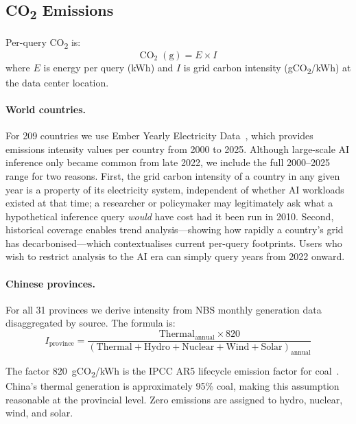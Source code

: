 \documentclass[11pt,a4paper]{article}
\begin{document}
\subsection{CO\textsubscript{2} Emissions}

Per-query CO\textsubscript{2} is:
\begin{equation}
  \text{CO}_2 \; (\text{g}) = E \times I
\end{equation}
where $E$ is energy per query (kWh) and $I$ is grid carbon intensity
(gCO\textsubscript{2}/kWh) at the data center location.

\paragraph{World countries.}
For 209 countries we use Ember Yearly Electricity Data~\cite{ember}, which
provides emissions intensity values per country from 2000 to 2025.
Although large-scale AI inference only became common from late 2022, we
include the full 2000--2025 range for two reasons. First, the grid carbon
intensity of a country in any given year is a property of its electricity
system, independent of whether AI workloads existed at that time; a
researcher or policymaker may legitimately ask what a hypothetical inference
query \emph{would} have cost had it been run in 2010. Second, historical
coverage enables trend analysis---showing how rapidly a country's grid has
decarbonised---which contextualises current per-query footprints. Users who
wish to restrict analysis to the AI era can simply query years from 2022
onward.

\paragraph{Chinese provinces.}
For all 31 provinces we derive intensity from NBS monthly generation data
disaggregated by source. The formula is:
\begin{equation}
  I_{\text{province}} =
  \frac{\text{Thermal}_{\text{annual}} \times 820}%
       {(\text{Thermal} + \text{Hydro} + \text{Nuclear} + \text{Wind} +
         \text{Solar})_{\text{annual}}}
\end{equation}

The factor 820~gCO\textsubscript{2}/kWh is the IPCC AR5 lifecycle emission
factor for coal~\cite{ipcc2014}. China's thermal generation is approximately
95\% coal, making this assumption reasonable at the provincial level. Zero
emissions are assigned to hydro, nuclear, wind, and solar.
\end{document}
